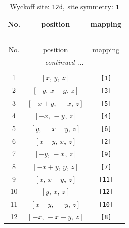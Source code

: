 \documentclass[fleqn,8pt]{jsarticle}
\begin{document}
\begin{longtable}{ccc}
\caption{Wyckoff site: {\tt 12d}, site symmetry: {\tt 1}}
 \\
 \hline \hline
No. & position & mapping \\ \hline \endfirsthead

\multicolumn{2}{l}{\tablename\ \thetable{}} \\
 \hline \hline
No. & position & mapping \\ \hline \endhead

 \hline \hline
\multicolumn{2}{r}{\footnotesize\it continued ...} \\ \endfoot

 \hline \hline
\multicolumn{2}{r}{} \\ \endlastfoot

1 & $\left[ x,\, y,\, z \right]$ & {\tt [1]} \\ \hline
2 & $\left[ - y,\, x - y,\, z \right]$ & {\tt [3]} \\ \hline
3 & $\left[ - x + y,\, - x,\, z \right]$ & {\tt [5]} \\ \hline
4 & $\left[ - x,\, - y,\, z \right]$ & {\tt [4]} \\ \hline
5 & $\left[ y,\, - x + y,\, z \right]$ & {\tt [6]} \\ \hline
6 & $\left[ x - y,\, x,\, z \right]$ & {\tt [2]} \\ \hline
7 & $\left[ - y,\, - x,\, z \right]$ & {\tt [9]} \\ \hline
8 & $\left[ - x + y,\, y,\, z \right]$ & {\tt [7]} \\ \hline
9 & $\left[ x,\, x - y,\, z \right]$ & {\tt [11]} \\ \hline
10 & $\left[ y,\, x,\, z \right]$ & {\tt [12]} \\ \hline
11 & $\left[ x - y,\, - y,\, z \right]$ & {\tt [10]} \\ \hline
12 & $\left[ - x,\, - x + y,\, z \right]$ & {\tt [8]} \\
\end{longtable}
\end{document}

